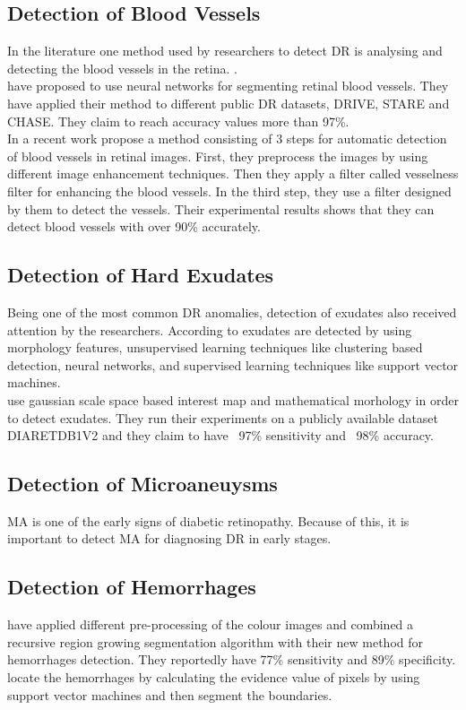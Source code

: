 \subsection{Detection of Blood Vessels}
In the literature one method used by researchers to detect DR is analysing and detecting the blood vessels in the retina. \citep{liskowski2016segmenting, elbalaoui2016automatic}.\\ 
\citet{liskowski2016segmenting} have proposed to use neural networks for segmenting retinal blood vessels. They have applied their method to different public DR datasets, DRIVE, STARE and CHASE. They claim to reach accuracy values more than 97\%. \\
In a recent work \citet{elbalaoui2016automatic} propose a method consisting of 3 steps for automatic detection of blood vessels in retinal images. First, they preprocess the images by using different image enhancement techniques. Then they apply a filter called vesselness filter for enhancing the blood vessels. In the third step, they use a filter designed by them to detect the vessels. Their experimental results shows that they can detect blood vessels with over 90\% accurately.   
\subsection{Detection of Hard Exudates}
Being one of the most common DR anomalies, detection of exudates also received attention by the researchers.  \citep{rocha2011points}
According to \citet{zohoradetection} exudates are detected by using morphology features, unsupervised learning techniques like clustering based detection, neural networks, and supervised learning techniques like support vector machines.\\ 
\citet{haloigaussian} use gaussian scale space based interest map and mathematical morhology in order to detect exudates. They run their experiments on a publicly available dataset DIARETDB1V2 and they claim to have ~97\% sensitivity and ~98\% accuracy.  



\subsection{Detection of Microaneuysms}
MA is one of the early signs of diabetic retinopathy. Because of this, it is important to detect MA for diagnosing DR in early stages.


\subsection{Detection of Hemorrhages}
\citet{sinthanayothin2002automated} have applied different pre-processing of the colour images and combined a recursive region growing segmentation algorithm with their new method for hemorrhages detection. They reportedly have 77\% sensitivity and 89\% specificity.\\
\citet{zhang2005top}  locate the hemorrhages by calculating the evidence value of pixels by using support vector machines and then segment the boundaries. 



